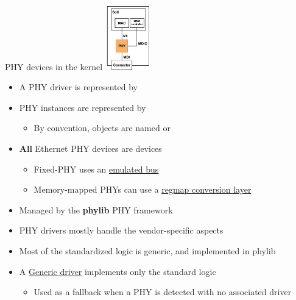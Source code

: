 \begin{frame}{PHY devices in the kernel}
	\hfill
	\includegraphics[width=0.15\textwidth]{slides/networking-driver-phy/phy.pdf}
	\vspace{-3cm}
	\begin{itemize}
		\item A PHY driver is represented by 
		\item PHY instances are represented by 
			\begin{itemize}
				\item By convention, objects are named  or 
			\end{itemize}
		\item \textbf{All} Ethernet PHY devices are  devices
			\begin{itemize}
				\item Fixed-PHY uses an \href{https://elixir.bootlin.com/linux/v6.15.1/source/drivers/net/phy/swphy.c}{emulated bus}
				\item Memory-mapped PHYs can use a \href{https://elixir.bootlin.com/linux/v6.15.1/source/drivers/net/mdio/mdio-regmap.c}{regmap conversion layer}
			\end{itemize}
		\item Managed by the \textbf{phylib} PHY framework
		\item PHY drivers mostly handle the vendor-specific aspects
		\item Most of the standardized logic is generic, and implemented in phylib
		\item A \href{https://elixir.bootlin.com/linux/v6.15.1/source/drivers/net/phy/phy_device.c\#L3510}{Generic driver} implements only the standard logic
			\begin{itemize}
				\item Used as a fallback when a PHY is detected with no associated driver
			\end{itemize}
	\end{itemize}
\end{frame}

